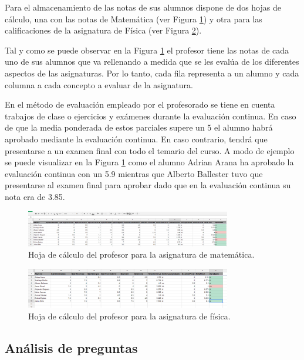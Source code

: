 Para el almacenamiento de las notas de sus alumnos dispone de dos hojas de cálculo, una con las notas de Matemática (ver Figura \ref{fig:SheetNotasMate}) y otra para las calificaciones de la asignatura de Física (ver Figura \ref{fig:SheetNotasFisica}).

Tal y como se puede observar en la Figura \ref{fig:SheetNotasMate} el profesor tiene las notas de cada uno de sus alumnos que va rellenando a medida que se les evalúa de los diferentes aspectos de las asignaturas. Por lo tanto, cada fila representa a un alumno y cada columna a cada concepto a evaluar de la asignatura.

En el método de evaluación empleado por el profesorado se tiene en cuenta trabajos de clase o ejercicios y exámenes durante la evaluación continua. En caso de que la media ponderada de estos parciales supere un 5 el alumno habrá aprobado mediante la evaluación continua. En caso contrario, tendrá que presentarse a un examen final con todo el temario del curso. A modo de ejemplo se puede visualizar en la Figura \ref{fig:SheetNotasMate} como el alumno Adrian Arana ha aprobado la evaluación continua con un 5.9 mientras que Alberto Ballester tuvo que presentarse al examen final para aprobar dado que en la evaluación continua su nota era de 3.85.

\begin{figure}[htb]
	\centering
	\includegraphics[width=0.8\textwidth]{./figs/sheetNotasMate.png}
	\caption{Hoja de cálculo del profesor para la asignatura de matemática.} \label{fig:SheetNotasMate}
\end{figure}

\begin{figure}[htb]
	\centering
	\includegraphics[width=0.8\textwidth]{./figs/sheetNotasFisica.png}
	\caption{Hoja de cálculo del profesor para la asignatura de física.} \label{fig:SheetNotasFisica}
\end{figure}

\subsection{Análisis de preguntas}
\label{sec:queriesNotas}


